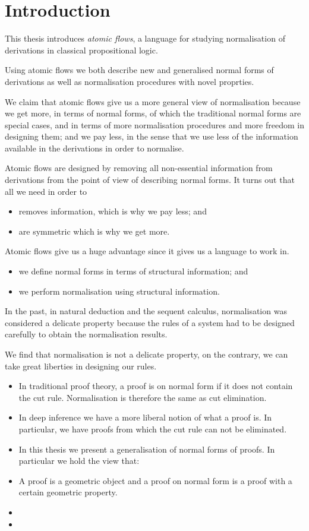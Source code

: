 \chapter{Introduction}

This thesis introduces \emph{atomic flows}, a language for studying normalisation of derivations in classical propositional logic.



Using atomic flows we both describe new and generalised normal forms of derivations as well as normalisation procedures with novel proprties.

We claim that atomic flows give us a more general view of normalisation because we get more, in terms of normal forms, of which the traditional normal forms are special cases, and in terms of more normalisation procedures and more freedom in designing them; and we pay less, in the sense that we use less of the information available in the derivations in order to normalise.

Atomic flows are designed by removing all non-essential information from derivations from the point of view of describing normal forms. It turns out that all we need in order to
\begin{itemize}
\item removes information, which is why we pay less; and
\item are symmetric which is why we get more.
\end{itemize}

Atomic flows give us a huge advantage since it gives us a language to work in.

\begin{itemize}
\item we define normal forms in terms of structural information; and
\item we perform normalisation using structural information.
\end{itemize}

In the past, in natural deduction and the sequent calculus, normalisation was considered a delicate property because the rules of a system had to be designed carefully to obtain the normalisation results.

We find that normalisation is not a delicate property, on the contrary, we can take great liberties in designing our rules.
\begin{itemize}
\item
In traditional proof theory, a proof is on normal form if it does not contain the cut rule. Normalisation is therefore the same as cut elimination.
\item
In deep inference we have a more liberal notion of what a proof is. In particular, we have proofs from which the cut rule can not be eliminated.
\item
In this thesis we present a generalisation of normal forms of proofs. In particular we hold the view that:
\item
A proof is a geometric object and a proof on normal form is a proof with a certain geometric property.
\item
\item
\end{itemize}

